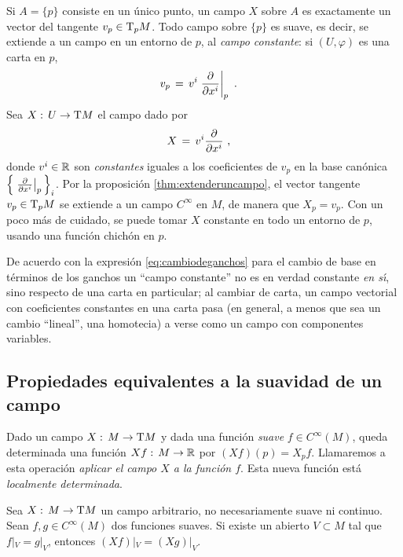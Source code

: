 Si $A=\{p\}$ consiste en un \'{u}nico punto, un campo $X$ sobre $A$ es
exactamente un vector del tangente $v_{p}\in\tangente[p]{M}$. Todo campo
sobre $\{p\}$ es suave, es decir, se extiende a un campo en un entorno de
$p$, al \emph{campo constante}: si $(U,\varphi)$ es una carta en $p$,
\begin{align*}
	v_{p} & \,=\, v^{i}\gancho[p]{x^{i}}
	\text{ .}
\end{align*}
%
Sea $X:\,U\rightarrow\tangente{M}$ el campo dado por
\begin{align*}
	X & \,=\, v^{i}\gancho{x^{i}}
	\text{ ,}
\end{align*}
%
donde $v^{i}\in\mathbb{R}$ son \emph{constantes} iguales a los coeficientes
de $v_{p}$ en la base can\'{o}nica $\Big\{\gancho[p]{x^{i}}\Big\}_{i}$.
Por la proposici\'{o}n \ref{thm:extenderuncampo}, el vector tangente
$v_{p}\in\tangente[p]{M}$ se extiende a un campo $C^{\infty}$ en $M$,
de manera que $X_{p}=v_{p}$. Con un poco m\'{a}s de cuidado, se puede
tomar $X$ constante en todo un entorno de $p$, usando una funci\'{o}n
chich\'{o}n en $p$.

\begin{obsCamposConstantes}\label{obs:camposconstantes}
	De acuerdo con la expresi\'{o}n \eqref{eq:cambiodeganchos} para el
	cambio de base en t\'{e}rminos de los ganchos un ``campo constante''
	no es en verdad constante \emph{en s\'{\i}}, sino respecto de una
	carta en particular; al cambiar de carta, un campo vectorial con
	coeficientes constantes en una carta pasa (en general, a menos que
	sea un cambio ``lineal'', una homotecia) a verse como un campo con
	componentes variables.
\end{obsCamposConstantes}

\subsection{Propiedades equivalentes a la suavidad de un campo}
Dado un campo $X:\,M\rightarrow\tangente{M}$ y dada una funci\'{o}n
\emph{suave} $f\in C^{\infty}(M)$, queda determinada una funci\'{o}n
$Xf:\,M\rightarrow\mathbb{R}$ por $(Xf)(p)=X_{p}f$. Llamaremos a esta
operaci\'{o}n \emph{aplicar el campo $X$ a la funci\'{o}n $f$}. Esta
nueva funci\'{o}n est\'{a} \emph{localmente determinada}.

\begin{lemaAplicarCamposLocalmenteDeterminado}%
	\label{thm:aplicarcamposlocalmentedeterminado}
	Sea $X:\,M\rightarrow\tangente{M}$ un campo arbitrario, no
	necesariamente suave ni continuo. Sean $f,g\in C^{\infty}(M)$ dos
	funciones suaves. Si existe un abierto $V\subset M$ tal que
	$f|_{V}=g|_{V}$, entonces $(Xf)|_{V}=(Xg)|_{V}$.
\end{lemaAplicarCamposLocalmenteDeterminado}

